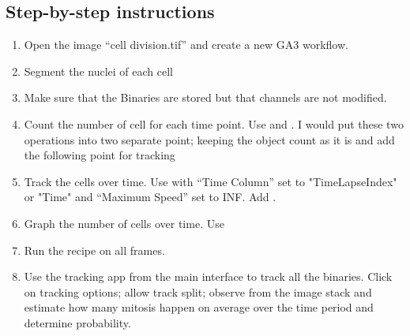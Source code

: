 \subsection{Step-by-step instructions}

\begin{enumerate}
    \item Open the image ``cell division.tif'' and create a new GA3 workflow.
    \item Segment the nuclei of each cell 
    \item Make sure that the Binaries are stored but that channels are not modified.
    \item Count the number of cell for each time point. Use  and .
    I would put these two operations into two separate point; keeping the object count as it is and add the following point for tracking
    \item Track the cells over time. Use  with ``Time Column'' set to "TimeLapseIndex" or "Time" and ``Maximum Speed'' set to INF. Add .
    \item Graph the number of cells over time. Use 
    \item Run the recipe on all frames. 
    \item Use the tracking app from the main interface to track all the binaries.
    Click on tracking options; allow track split; observe from the image stack and estimate how many mitosis happen on average over the time period and determine probability.
\end{enumerate}
